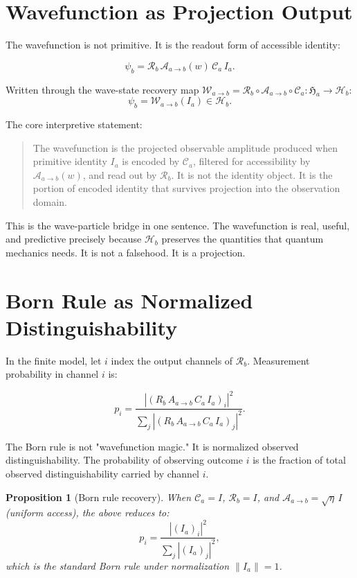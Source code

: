 \documentclass[11pt,a4paper,oneside]{article}
\newtheorem{proposition}{Proposition}[section]
\newcommand{\Ia}{I_a}
\newcommand{\Ha}{\mathfrak{H}_a}
\newcommand{\Hb}{\mathcal{H}_b}
\newcommand{\Ca}{\mathcal{C}_a}
\newcommand{\Aab}{\mathcal{A}_{a\to b}}
\newcommand{\Rb}{\mathcal{R}_b}
\newcommand{\psiab}{\psi_b}
\newcommand{\Wab}{\mathcal{W}_{a\to b}}
\begin{document}
\section{Wavefunction as Projection Output}

The wavefunction is not primitive. It is the readout form of accessible identity:

\[
\boxed{\psiab = \Rb\,\Aab(w)\,\Ca\,\Ia.}
\]

Written through the wave-state recovery map $\Wab = \Rb \circ \Aab \circ \Ca : \Ha \to \Hb$:
\[
\psiab = \Wab(\Ia) \in \Hb.
\]

The core interpretive statement:
\begin{quote}
The wavefunction is the projected observable amplitude produced when primitive identity $\Ia$ is encoded by $\Ca$, filtered for accessibility by $\Aab(w)$, and read out by $\Rb$. It is not the identity object. It is the portion of encoded identity that survives projection into the observation domain.
\end{quote}

This is the wave-particle bridge in one sentence. The wavefunction is real, useful, and predictive precisely because $\Hb$ preserves the quantities that quantum mechanics needs. It is not a falsehood. It is a projection.

\section{Born Rule as Normalized Distinguishability}

In the finite model, let $i$ index the output channels of $\Rb$. Measurement probability in channel $i$ is:

\[
\boxed{p_i = \frac{\left|(R_b\,A_{a\to b}\,C_a\,\Ia)_i\right|^2}{\displaystyle\sum_j \left|(R_b\,A_{a\to b}\,C_a\,\Ia)_j\right|^2}.}
\]

The Born rule is not "wavefunction magic." It is normalized observed distinguishability. The probability of observing outcome $i$ is the fraction of total observed distinguishability carried by channel $i$.

\begin{proposition}[Born rule recovery]
When $\Ca = I$, $\Rb = I$, and $\Aab = \sqrt{\eta}\,I$ (uniform access), the above reduces to:
\[
p_i = \frac{|(\Ia)_i|^2}{\sum_j |(\Ia)_j|^2},
\]
which is the standard Born rule under normalization $\|\Ia\| = 1$.
\end{proposition}
\end{document}
